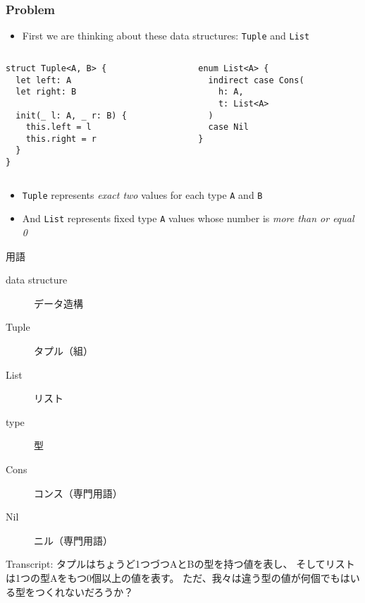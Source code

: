 \begin{frame}[fragile]
  \frametitle{Problem}

  \begin{itemize}
    \item First we are thinking about these data structures: \lstinline|Tuple| and \lstinline|List|
  \end{itemize}
  
  \begin{columns}
    \begin{column}{0.5\textwidth}
\begin{lstlisting}[style=swift]
struct Tuple<A, B> {
  let left: A
  let right: B
 
  init(_ l: A, _ r: B) {
    this.left = l
    this.right = r
  }
}
\end{lstlisting}
    \end{column}
    \begin{column}{0.5\textwidth}
\begin{lstlisting}[style=swift]
enum List<A> {
  indirect case Cons(
    h: A,
    t: List<A>
  )
  case Nil
}
\end{lstlisting}
    \end{column}
  \end{columns}

  \pause
  \begin{itemize}
    \item<+-> \lstinline|Tuple| represents \emph{exact two} values
    for each type \lstinline|A| and \lstinline|B|

    \item<+-> And \lstinline|List| represents fixed type \lstinline|A| values
    whose number is \emph{more than or equal 0}
  \end{itemize}


  \begin{notes}
    \item 用語
    \begin{description}
      \item[data structure] データ造構
      \item[Tuple] タプル（組）
      \item[List] リスト
      \item[type] 型
      \item[Cons] コンス（専門用語）
      \item[Nil] ニル（専門用語）
    \end{description}

    \item Transcript:
    タプルはちょうど1つづつAとBの型を持つ値を表し、
    そしてリストは1つの型Aをもつ0個以上の値を表す。
    ただ、我々は違う型の値が何個でもはいる型をつくれないだろうか？
  \end{notes}
\end{frame}

